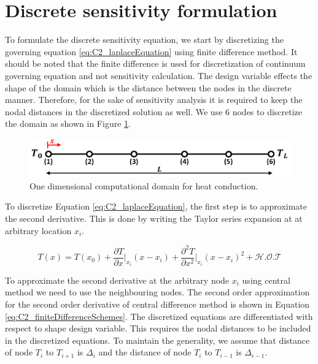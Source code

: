 \section{Discrete sensitivity formulation}
To formulate the discrete sensitivity equation, we start by discretizing the governing equation \eqref{eq:C2_laplaceEquation} using finite difference method. It should be noted that the finite difference is used for discretization of continuum governing equation and not sensitivity calculation. The design variable effects the shape of the domain which is the distance between the nodes in the discrete manner. Therefore, for the sake of sensitivity analysis it is required to keep the nodal distances in the discretized solution as well. We use 6 nodes to discretize the domain as shown in Figure \ref{fig:C2_discretizedDomain}.

\begin{figure}[h]
	\centering
	\includegraphics[width=14.00cm]{Chapter_2/figure/benchmark_case_computational_domain.png}
	\caption{One dimensional computational domain for heat conduction.}
	\label{fig:C2_discretizedDomain}
\end{figure}

To discretize Equation \eqref{eq:C2_laplaceEquation}, the first step is to approximate the second derivative. This is done by writing the Taylor series expansion at at arbitrary location $x_i$.

\begin{equation*}
	T(x) = 
	T(x_0) + 
	\frac{\partial T}{\partial x} \bigg|_{x_i} (x - x_i) + 
	\frac{\partial^2 T}{\partial x^2} \bigg|_{x_i} (x - x_i)^2 + 
	\mathcal{H} . \mathcal{O} . \mathcal{T}
\end{equation*}

To approximate the second derivative at the arbitrary node $x_i$ using central method we need to use the neighbouring nodes. The second order approximation for the second order derivative of central difference method is shown in Equation \eqref{eq:C2_finiteDifferenceSchemes}. The discretized equations are differentiated with respect to shape design variable. This requires the nodal distances to be included in the discretized equations. To maintain the generality, we assume that distance of node $T_i$ to $T_{i+1}$ is $\Delta_i$ and the distance of node $T_i$ to $T_{i-1}$ is $\Delta_{i-1}$.

